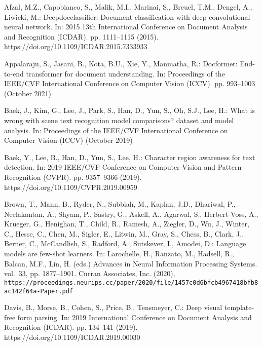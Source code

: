 \documentclass[runningheads]{llncs}
\begin{document}
\clearpage


\begin{thebibliography}{10}
\providecommand{\url}[1]{\texttt{#1}}
\providecommand{\urlprefix}{URL }
\providecommand{\doi}[1]{https://doi.org/#1}

Afzal, M.Z., Capobianco, S., Malik, M.I., Marinai, S., Breuel, T.M., Dengel,
  A., Liwicki, M.: Deepdocclassifier: Document classification with deep
  convolutional neural network. In: 2015 13th International Conference on
  Document Analysis and Recognition (ICDAR). pp. 1111--1115 (2015).
  \doi{10.1109/ICDAR.2015.7333933}

Appalaraju, S., Jasani, B., Kota, B.U., Xie, Y., Manmatha, R.: Docformer:
  End-to-end transformer for document understanding. In: Proceedings of the
  IEEE/CVF International Conference on Computer Vision (ICCV). pp. 993--1003
  (October 2021)

Baek, J., Kim, G., Lee, J., Park, S., Han, D., Yun, S., Oh, S.J., Lee, H.: What
  is wrong with scene text recognition model comparisons? dataset and model
  analysis. In: Proceedings of the IEEE/CVF International Conference on
  Computer Vision (ICCV) (October 2019)

Baek, Y., Lee, B., Han, D., Yun, S., Lee, H.: Character region awareness for
  text detection. In: 2019 IEEE/CVF Conference on Computer Vision and Pattern
  Recognition (CVPR). pp. 9357--9366 (2019). \doi{10.1109/CVPR.2019.00959}

Brown, T., Mann, B., Ryder, N., Subbiah, M., Kaplan, J.D., Dhariwal, P.,
  Neelakantan, A., Shyam, P., Sastry, G., Askell, A., Agarwal, S.,
  Herbert-Voss, A., Krueger, G., Henighan, T., Child, R., Ramesh, A., Ziegler,
  D., Wu, J., Winter, C., Hesse, C., Chen, M., Sigler, E., Litwin, M., Gray,
  S., Chess, B., Clark, J., Berner, C., McCandlish, S., Radford, A., Sutskever,
  I., Amodei, D.: Language models are few-shot learners. In: Larochelle, H.,
  Ranzato, M., Hadsell, R., Balcan, M.F., Lin, H. (eds.) Advances in Neural
  Information Processing Systems. vol.~33, pp. 1877--1901. Curran Associates,
  Inc. (2020),
  \url{https://proceedings.neurips.cc/paper/2020/file/1457c0d6bfcb4967418bfb8ac142f64a-Paper.pdf}

Davis, B., Morse, B., Cohen, S., Price, B., Tensmeyer, C.: Deep visual
  template-free form parsing. In: 2019 International Conference on Document
  Analysis and Recognition (ICDAR). pp. 134--141 (2019).
  \doi{10.1109/ICDAR.2019.00030}


\end{thebibliography}
\end{document}
